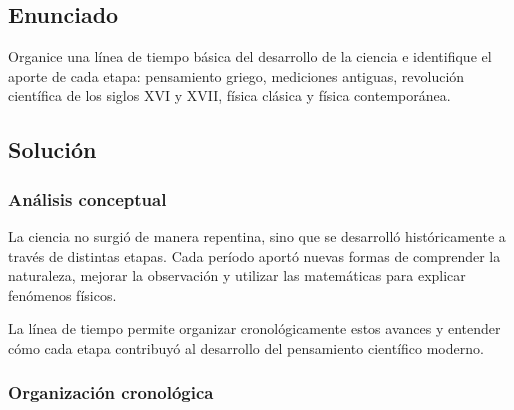 \documentclass[12pt, a4paper]{article}
\begin{document}
\subsection*{Enunciado}

Organice una línea de tiempo básica del desarrollo de la ciencia e identifique el aporte de cada etapa: pensamiento griego, mediciones antiguas, revolución científica de los siglos XVI y XVII, física clásica y física contemporánea.

\subsection*{Solución}

\subsubsection*{Análisis conceptual}

La ciencia no surgió de manera repentina, sino que se desarrolló históricamente a través de distintas etapas. Cada período aportó nuevas formas de comprender la naturaleza, mejorar la observación y utilizar las matemáticas para explicar fenómenos físicos.

La línea de tiempo permite organizar cronológicamente estos avances y entender cómo cada etapa contribuyó al desarrollo del pensamiento científico moderno.

\subsubsection*{Organización cronológica}

\begin{center}
\end{center}
\end{document}
